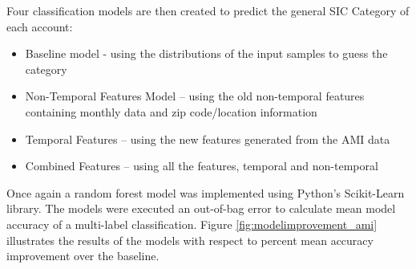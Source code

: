 Four classification models are then created to predict the general SIC Category of each account:
\begin{itemize}
\item Baseline model - using the distributions of the input samples to guess the category
\item Non-Temporal Features Model – using the old non-temporal features containing monthly data and zip code/location information
\item Temporal Features – using the new features generated from the AMI data
\item Combined Features – using all the features, temporal and non-temporal
\end{itemize}

Once again a random forest model was implemented using Python’s Scikit-Learn library. The models were executed an out-of-bag error to calculate mean model accuracy of a multi-label classification. Figure \ref{fig:modelimprovement_ami} illustrates the results of the models with respect to percent mean accuracy improvement over the baseline.

